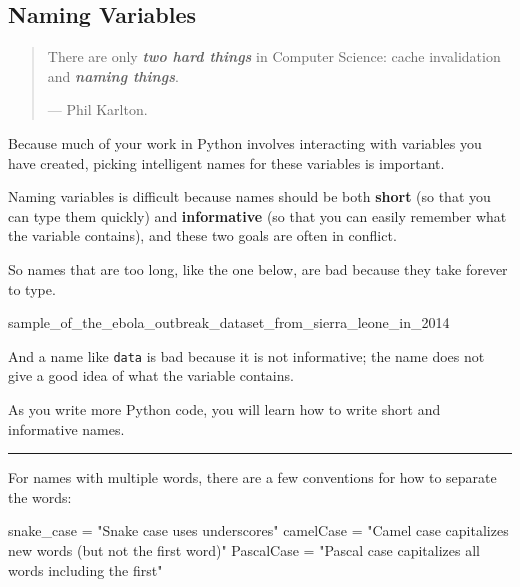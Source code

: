 \documentclass[
  letterpaper,
  DIV=11,
  numbers=noendperiod]{scrreprt}
\newenvironment{Shaded}{\begin{snugshade}}{\end{snugshade}}
\newcommand{\NormalTok}[1]{\textcolor[rgb]{0.00,0.23,0.31}{#1}}
\newcommand{\OperatorTok}[1]{\textcolor[rgb]{0.37,0.37,0.37}{#1}}
\newcommand{\StringTok}[1]{\textcolor[rgb]{0.13,0.47,0.30}{#1}}
\begin{document}
\subsection{Naming Variables}\label{naming-variables}

\begin{quote}
There are only \textbf{\emph{two hard things}} in Computer Science:
cache invalidation and \textbf{\emph{naming things}}.

--- Phil Karlton.
\end{quote}

Because much of your work in Python involves interacting with variables
you have created, picking intelligent names for these variables is
important.

Naming variables is difficult because names should be both
\textbf{short} (so that you can type them quickly) and
\textbf{informative} (so that you can easily remember what the variable
contains), and these two goals are often in conflict.

So names that are too long, like the one below, are bad because they
take forever to type.

\begin{Shaded}
\begin{Highlighting}[]
\NormalTok{sample\_of\_the\_ebola\_outbreak\_dataset\_from\_sierra\_leone\_in\_2014}
\end{Highlighting}
\end{Shaded}

And a name like \texttt{data} is bad because it is not informative; the
name does not give a good idea of what the variable contains.

As you write more Python code, you will learn how to write short and
informative names.

\begin{center}\rule{0.5\linewidth}{0.5pt}\end{center}

For names with multiple words, there are a few conventions for how to
separate the words:

\begin{Shaded}
\begin{Highlighting}[]
\NormalTok{snake\_case }\OperatorTok{=} \StringTok{"Snake case uses underscores"}
\NormalTok{camelCase }\OperatorTok{=} \StringTok{"Camel case capitalizes new words (but not the first word)"}
\NormalTok{PascalCase }\OperatorTok{=} \StringTok{"Pascal case capitalizes all words including the first"}
\end{Highlighting}
\end{Shaded}
\end{document}
